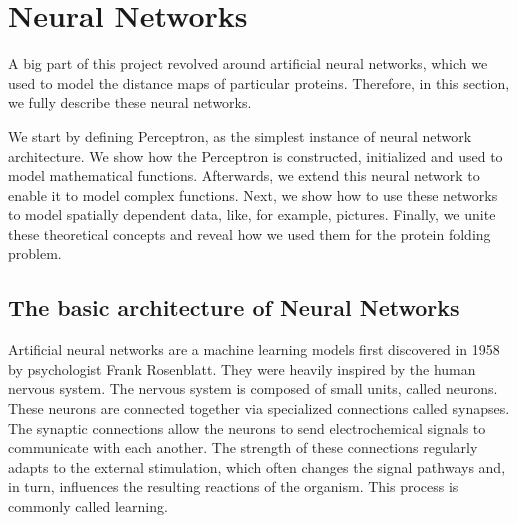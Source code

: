 \newpage
\section{Neural Networks}
A big part of this project revolved around artificial neural networks, which we used to model the distance maps of particular proteins. 
Therefore, in this section, we fully describe these neural networks.

We start by defining Perceptron, as the simplest instance of neural network architecture.
We show how the Perceptron is constructed, initialized and used to model mathematical functions.
Afterwards, we extend this neural network to enable it to model complex functions.
Next, we show how to use these networks to model spatially dependent data, like, for example, pictures.
Finally, we unite these theoretical concepts and reveal how we used them for the protein folding problem.






\subsection{The basic architecture of Neural Networks}
Artificial neural networks are a machine learning models first discovered in 1958 by psychologist Frank Rosenblatt.
They were heavily inspired by the human nervous system.
The nervous system is composed of small units, called neurons.
These neurons are connected together via specialized connections called synapses.
The synaptic connections allow the neurons to send electrochemical signals to communicate with each another.
The strength of these connections regularly adapts to the external stimulation, which often changes the signal pathways and, in turn, influences the resulting reactions of the organism.
This process is commonly called learning.

